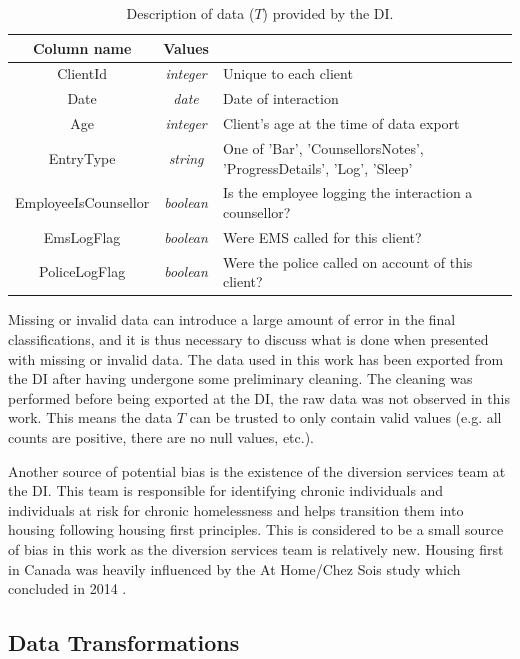 \begin{table}[h!]
	\begin{tabular}{ c c p{} } 
		\toprule
		Column name & Values &  \\
		\midrule
		ClientId & \emph{integer} & Unique to each client \\
		Date & \emph{date} & Date of interaction \\
		Age & \emph{integer} & Client's age at the time of data export \\
		EntryType & \emph{string} & One of 'Bar', 'CounsellorsNotes', 'ProgressDetails', 'Log', 'Sleep' \\
		EmployeeIsCounsellor & \emph{boolean} & Is the employee logging the interaction a counsellor? \\
		EmsLogFlag & \emph{boolean} & Were EMS called for this client? \\
		PoliceLogFlag & \emph{boolean} & Were the police called on account of this client? \\
		\bottomrule
	\end{tabular}
	\caption{Description of data ($T$) provided by the DI.}
	\label{tbl:university}
\end{table}


Missing or invalid data can introduce a large amount of error in the final classifications, and it is thus necessary to discuss what is done when presented with missing or invalid data. The data used in this work has been exported from the DI after having undergone some preliminary cleaning. The cleaning was performed before being exported at the DI, the raw data was not observed in this work. This means the data $T$ can be trusted to only contain valid values (e.g. all counts are positive, there are no null values, etc.). 

Another source of potential bias is the existence of the diversion services team at the DI. This team is responsible for identifying chronic individuals and individuals at risk for chronic homelessness and helps transition them into housing following housing first principles. This is considered to be a small source of bias in this work as the diversion services team is relatively new. Housing first in Canada was heavily influenced by the At Home/Chez Sois study which concluded in 2014 \cite{athome2014chezsoi}.

\subsection{Data Transformations}

